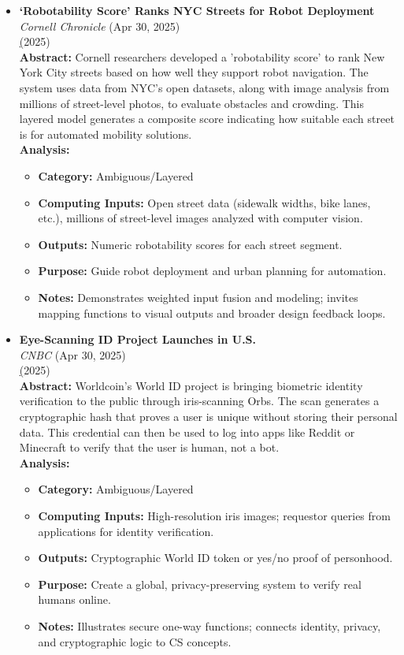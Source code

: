 \documentclass[11pt]{article}
\begin{document}
\begin{itemize}
\item \textbf{‘Robotability Score’ Ranks NYC Streets for Robot Deployment} \\
\textit{Cornell Chronicle} (Apr 30, 2025)\\
\href{https://technews.acm.org/archives.cfm?fo=2025-04-apr#39} (2025)\\
\textbf{Abstract:} Cornell researchers developed a 'robotability score' to rank New York City streets based on how well they support robot navigation. The system uses data from NYC’s open datasets, along with image analysis from millions of street-level photos, to evaluate obstacles and crowding. This layered model generates a composite score indicating how suitable each street is for automated mobility solutions.\\
\textbf{Analysis:}\\
\begin{itemize}
\item \textbf{Category:} Ambiguous/Layered
\item \textbf{Computing Inputs:} Open street data (sidewalk widths, bike lanes, etc.), millions of street-level images analyzed with computer vision.
\item \textbf{Outputs:} Numeric robotability scores for each street segment.
\item \textbf{Purpose:} Guide robot deployment and urban planning for automation.
\item \textbf{Notes:} Demonstrates weighted input fusion and modeling; invites mapping functions to visual outputs and broader design feedback loops.
\end{itemize}

\item \textbf{Eye-Scanning ID Project Launches in U.S.} \\
\textit{CNBC} (Apr 30, 2025)\\
\href{https://technews.acm.org/archives.cfm?fo=2025-04-apr#41} (2025)\\
\textbf{Abstract:} Worldcoin's World ID project is bringing biometric identity verification to the public through iris-scanning Orbs. The scan generates a cryptographic hash that proves a user is unique without storing their personal data. This credential can then be used to log into apps like Reddit or Minecraft to verify that the user is human, not a bot.\\
\textbf{Analysis:}\\
\begin{itemize}
\item \textbf{Category:} Ambiguous/Layered
\item \textbf{Computing Inputs:} High-resolution iris images; requestor queries from applications for identity verification.
\item \textbf{Outputs:} Cryptographic World ID token or yes/no proof of personhood.
\item \textbf{Purpose:} Create a global, privacy-preserving system to verify real humans online.
\item \textbf{Notes:} Illustrates secure one-way functions; connects identity, privacy, and cryptographic logic to CS concepts.
\end{itemize}


\end{itemize}
\end{document}

